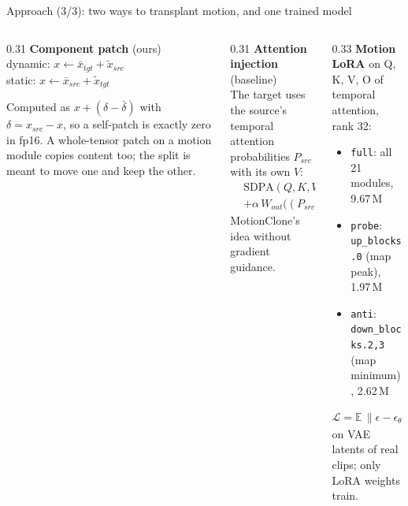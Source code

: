 \documentclass[aspectratio=169,11pt]{beamer}
\newcommand{\xs}{\bar{x}}
\newcommand{\xd}{\tilde{x}}
\newcommand{\code}[1]{\texttt{#1}}
\begin{document}
\begin{frame}{Approach (3/3): two ways to transplant motion, and one trained model}
  \begin{columns}[T,onlytextwidth]
    \begin{column}{0.31\textwidth}
      \footnotesize
      \textbf{Component patch} (ours)\\
      dynamic: $x \leftarrow \xs_{tgt} + \xd_{src}$\\
      static:\phantom{y} $x \leftarrow \xs_{src} + \xd_{tgt}$

      \vspace{1mm}
      Computed as $x + (\delta - \bar\delta)$ with $\delta = x_{src}-x$, so a self-patch is
      exactly zero in fp16. A whole-tensor patch on a motion module copies content too; the split
      is meant to move one and keep the other.
    \end{column}
    \begin{column}{0.31\textwidth}
      \footnotesize
      \textbf{Attention injection} (baseline)\\
      The target uses the source's temporal attention probabilities $P_{src}$ with its own $V$:
      \[
        \begin{aligned}&\mathrm{SDPA}(Q,K,V)\\ &+ \alpha\,W_{out}\big((P_{src}-P)V\big)\end{aligned}
      \]
      MotionClone's \cite{ling2025motionclone} idea without gradient guidance.
    \end{column}
    \begin{column}{0.33\textwidth}
      \footnotesize
      \textbf{Motion LoRA} \cite{hu2022lora} on Q, K, V, O of temporal attention, rank 32:
      \begin{itemize}
        \item \code{full}: all 21 modules, 9.67\,M
        \item \code{probe}: \code{up\_blocks.0} (map peak), 1.97\,M
        \item \code{anti}: \code{down\_blocks.2,3} (map minimum), 2.62\,M
      \end{itemize}
      \[
        \mathcal{L} = \mathbb{E}\,\big\|\epsilon - \epsilon_\theta(z_t, t, c)\big\|_2^2
      \]
      on VAE latents of real clips; only LoRA weights train.
    \end{column}
  \end{columns}
\end{frame}
\end{document}
